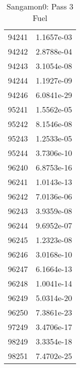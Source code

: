 \begin{table}[h!]
\begin{tabular}{|| c || c |}
94241 & 1.1657e-03 \\
94242 & 2.8788e-04 \\
94243 & 3.1054e-08 \\
94244 & 1.1927e-09 \\
94246 & 6.0841e-29 \\
95241 & 1.5562e-05 \\
95242 & 8.1546e-08 \\
95243 & 1.2533e-05 \\
95244 & 3.7306e-10 \\
96240 & 6.8753e-16 \\
96241 & 1.0143e-13 \\
96242 & 7.0136e-06 \\
96243 & 3.9359e-08 \\
96244 & 9.6952e-07 \\
96245 & 1.2323e-08 \\
96246 & 3.0168e-10 \\
96247 & 6.1664e-13 \\
96248 & 1.0041e-14 \\
96249 & 5.0314e-20 \\
96250 & 7.3861e-23 \\
97249 & 3.4706e-17 \\
98249 & 3.3354e-18 \\
98251 & 7.4702e-25 \\

\hline
\end{tabular}
\caption{Sangamon0: Pass 3 Fuel}
\label{table:sang0p3fuel}
\end{table}